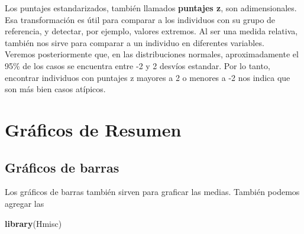 \documentclass[spanish,]{book}
\newenvironment{Shaded}{\begin{snugshade}}{\end{snugshade}}
\newcommand{\KeywordTok}[1]{\textcolor[rgb]{0.13,0.29,0.53}{\textbf{#1}}}
\newcommand{\NormalTok}[1]{#1}
\begin{document}
Los puntajes estandarizados, también llamados \textbf{puntajes z}, son
adimensionales. Esa transformación es útil para comparar a los
individuos con su grupo de referencia, y detectar, por ejemplo, valores
extremos. Al ser una medida relativa, también nos sirve para comparar a
un individuo en diferentes variables.\\
Veremos posteriormente que, en las distribuciones normales,
aproximadamente el 95\% de los casos se encuentra entre -2 y 2 desvíos
estandar. Por lo tanto, encontrar individuos con puntajes z mayores a 2
o menores a -2 nos indica que son más bien casos atípicos.

\chapter{Gráficos de Resumen}\label{graficos-de-resumen}

\section{Gráficos de barras}\label{graficos-de-barras}

Los gráficos de barras también sirven para graficar las medias. También
podemos agregar las

\begin{Shaded}
\begin{Highlighting}[]
\KeywordTok{library}\NormalTok{(Hmisc)}
\end{Highlighting}
\end{Shaded}
\end{document}
